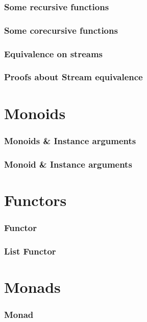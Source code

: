 \documentclass[xetex]{beamer}
\begin{document}
\begin{frame}
\frametitle{Some recursive functions}
\end{frame}


\begin{frame}
\frametitle{Some corecursive functions}
\end{frame}


\begin{frame}
\frametitle{Equivalence on streams}
\end{frame}

\begin{frame}
\frametitle{Proofs about Stream equivalence}
\end{frame}

\section{Monoids}

\begin{frame}
\frametitle{Monoids \& Instance arguments}
\end{frame}

\begin{frame}
\frametitle{Monoid \& Instance arguments}
\end{frame}

\section{Functors}

\begin{frame}
\frametitle{Functor}
\end{frame}

\begin{frame}
\frametitle{List Functor}
\end{frame}

\section{Monads}

\begin{frame}
\frametitle{Monad}
\end{frame}
\end{document}

